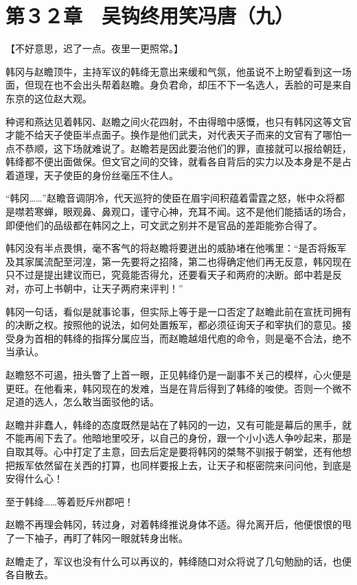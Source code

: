\section{第３２章　吴钩终用笑冯唐（九）}

【不好意思，迟了一点。夜里一更照常。】

韩冈与赵瞻顶牛，主持军议的韩绛无意出来缓和气氛，他虽说不上盼望看到这一场面，但现在也不会出头帮着赵瞻。身负君命，却压不下一名选人，丢脸的可是来自东京的这位赵大观。

种谔和燕达见着韩冈、赵瞻之间火花四射，不由得暗中感慨，也只有韩冈这等文官才能不给天子使臣半点面子。换作是他们武夫，对代表天子而来的文官有了哪怕一点不恭顺，这下场就难说了。赵瞻若是因此要治他们的罪，直接就可以报给朝廷，韩绛都不便出面做保。但文官之间的交锋，就看各自背后的实力以及本身是不是占着道理，天子使臣的身份丝毫压不住人。

“韩冈……”赵瞻音调阴冷，代天巡狩的使臣在眉宇间积蕴着雷霆之怒，帐中众将都是噤若寒蝉，眼观鼻、鼻观口，谨守心神，充耳不闻。这不是他们能插话的场合，即便他们的品级都在韩冈之上，可文武之别并不是官品的差距能弥合得了。

韩冈没有半点畏惧，毫不客气的将赵瞻将要迸出的威胁堵在他嘴里：“是否将叛军及其家属流配至河湟，第一先要将之招降，第二也得确定他们再无反意，韩冈现在只不过是提出建议而已，究竟能否得允，还要看天子和两府的决断。郎中若是反对，亦可上书朝中，让天子两府来评判！”

韩冈一句话，看似是就事论事，但实际上等于是一口否定了赵瞻此前在宣抚司拥有的决断之权。按照他的说法，如何处置叛军，都必须征询天子和宰执们的意见。接受身为首相的韩绛的指挥分属应当，而赵瞻越俎代庖的命令，则是毫不合法，绝不当承认。

赵瞻怒不可遏，扭头瞥了上首一眼，正见韩绛仍是一副事不关己的模样，心火便是更旺。在他看来，韩冈现在的发难，当是在背后得到了韩绛的唆使。否则一个微不足道的选人，怎么敢当面驳他的话。

赵瞻并非蠢人，韩绛的态度既然是站在了韩冈的一边，又有可能是幕后的黑手，就不能再闹下去了。他暗地里咬牙，以自己的身份，跟一个小小选人争吵起来，那是自取其辱。心中打定了主意，回去后定是要将韩冈的桀骜不驯报于朝堂，还有他想把叛军依然留在关西的打算，也同样要报上去，让天子和枢密院来问问他，到底是安得什么心！

至于韩绛……等着贬斥州郡吧！

赵瞻不再理会韩冈，转过身，对着韩绛推说身体不适。得允离开后，他便恨恨的甩了一下袖子，再盯了韩冈一眼就转身出帐。

赵瞻走了，军议也没有什么可以再议的，韩绛随口对众将说了几句勉励的话，也便各自散去。

